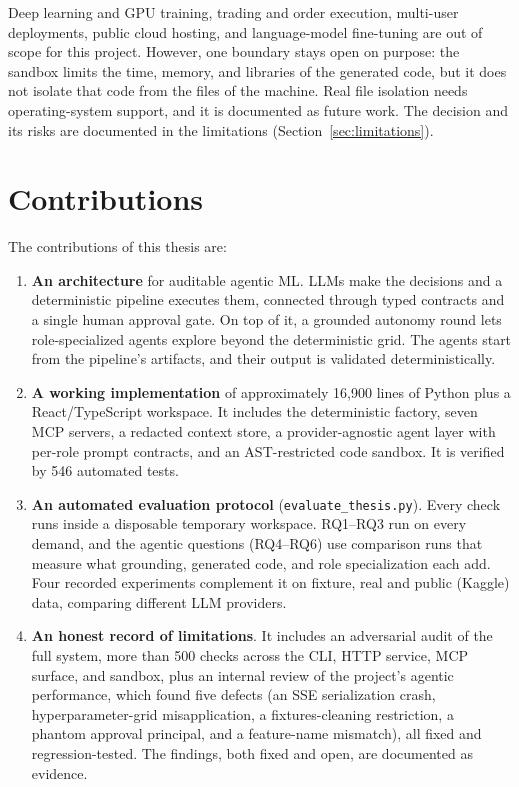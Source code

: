 Deep learning and GPU training, trading and order execution, multi-user deployments, public cloud hosting, and language-model fine-tuning are out of scope for this project. However, one boundary stays open on purpose: the sandbox limits the time, memory, and libraries of the generated code, but it does not isolate that code from the files of the machine. Real file isolation needs operating-system support, and it is documented as future work. The decision and its risks are documented in the limitations (Section~\ref{sec:limitations}).


\section{Contributions}
\label{sec:contributions}

The contributions of this thesis are:

\begin{enumerate}
	\item \textbf{An architecture} for auditable agentic ML. LLMs make the decisions and a deterministic pipeline executes them, connected through typed contracts and a single human approval gate. On top of it, a grounded autonomy round lets role-specialized agents explore beyond the deterministic grid. The agents start from the pipeline's artifacts, and their output is validated deterministically.
	\item \textbf{A working implementation} of approximately 16{,}900 lines of Python plus a React/TypeScript workspace. It includes the deterministic factory, seven MCP servers, a redacted context store, a provider-agnostic agent layer with per-role prompt contracts, and an AST-restricted code sandbox. It is verified by 546 automated tests.
	\item \textbf{An automated evaluation protocol} (\texttt{evaluate\_thesis.py}). Every check runs inside a disposable temporary workspace. RQ1--RQ3 run on every demand, and the agentic questions (RQ4--RQ6) use comparison runs that measure what grounding, generated code, and role specialization each add. Four recorded experiments complement it on fixture, real and public (Kaggle) data, comparing different LLM providers.
	\item \textbf{An honest record of limitations}. It includes an adversarial audit of the full system, more than 500 checks across the CLI, HTTP service, MCP surface, and sandbox, plus an internal review of the project's agentic performance, which found five defects (an SSE serialization crash, hyperparameter-grid misapplication, a fixtures-cleaning restriction, a phantom approval principal, and a feature-name mismatch), all fixed and regression-tested. The findings, both fixed and open, are documented as evidence.
\end{enumerate}


